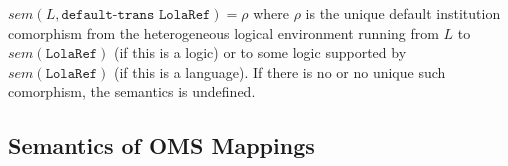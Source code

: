 \documentclass[10pt,fleqn,final]{scrreprt}
\makeatletter
\newcommand*\CommentAuthor{}
\renewcommand*\CommentAuthor{#1}}
\newcommand*\CommentDate{}
\renewcommand*\CommentDate{#1}}
\newcommand*\CommentId{}
\renewcommand*\CommentId{#1}}
\newcommand*\CommentType{}
\renewcommand*\CommentType{#1}}
\newcommand*{\SetCommentColorByType}[1]{%
\edef\localType{{#1}}%
\expandafter\ifstrequal\localType{q-aut}{\colorlet{CommentColor}{red}}{%
\expandafter\ifstrequal\localType{q-all}{\colorlet{CommentColor}{orange}}{%
\expandafter\ifstrequal\localType{todo}{\colorlet{CommentColor}{orange}}{%
\expandafter\ifstrequal\localType{fyi}{\colorlet{CommentColor}{lightgray}}{%
\colorlet{CommentColor}{yellow}}}}}}
\newcommand*{\SetCommentPrefixByType}[1]{%
\edef\localType{{#1}}%
\expandafter\@ifmtarg\localType{%
\edef\CommentPrefix{}%
}{%
\caseupper[q]{#1}%
\edef\CommentPrefix{\thestring: }%
}}
\newcommand*{\initComment}[1]{%
\setkeys{Comment}{#1}%
\SetCommentColorByType{\CommentType}%
\relax%
\SetCommentPrefixByType{\CommentType}%
\relax%
}
\newcommand*{\todonote}[2][]{%
\initComment{#1}%
\pdfcomment[author=\CommentAuthor,color=CommentColor,date=\CommentDate,id=\CommentId]{%
\CommentPrefix
#2}}
\renewcommand*{\todonote}[2][]{%
\initComment{#1}%
\ednote{\CommentPrefix #2}}
\newcommand*{\CLnote}[2][author=Christoph Lange]{%
\todonote[author=Christoph Lange,#1]{#2} 
}
\newcommand*{\syntax}[1]{\texttt{#1}}
\newcommand{\ssclause}[1]{\subsection{#1}}
\newenvironment{definitions}[0]{\medskip }{}
\makeatother
\begin{document}
\begin{definitions}


$sem(L,\syntax{default-trans LolaRef})=\rho$ where $\rho$ is the
unique default institution comorphism from the heterogeneous logical
environment running from $L$ to $sem(\syntax{LolaRef})$ (if this is a
logic) or to some logic supported by $sem(\syntax{LolaRef})$ (if this
is a language). If there is no or no unique such comorphism, the
semantics is undefined.




\ssclause{Semantics of OMS Mappings}\label{sec:oms-mappings}


\end{definitions}
\end{document}
